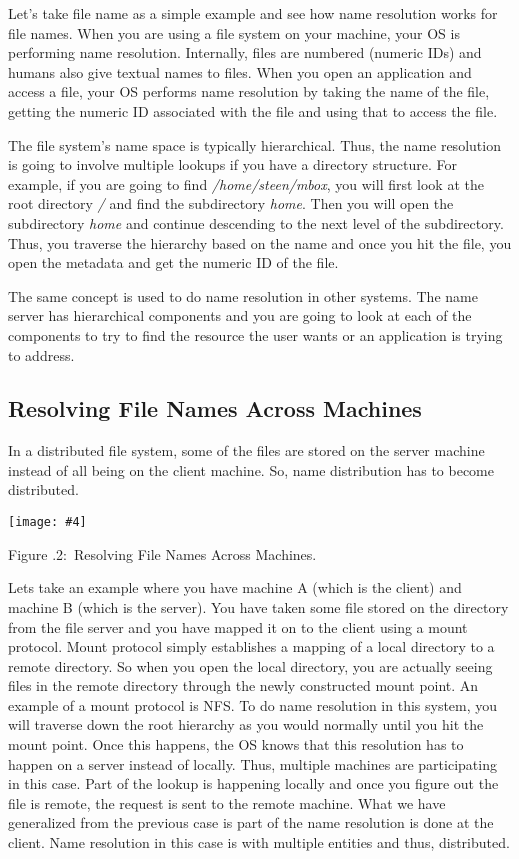 \documentclass[twoside]{article}
\newcounter{lecnum}
\newcommand{\fig}[4]{
            \centerline{\texttt{[image: \#4]}}
            \begin{center}
            Figure \thelecnum.#1:~#3
            \end{center}
    }
\begin{document}
Let’s take file name as a simple example and see how name resolution works for file names. When you are using a file system on your machine, your OS is performing name resolution. Internally, files are numbered (numeric IDs) and humans also give textual names to files. When you open an application and access a file, your OS performs name resolution by taking the name of the file, getting the numeric ID associated with the file and using that to access the file.  

The file system’s name space is typically hierarchical. Thus, the name resolution is going to involve multiple lookups if you have a directory structure. For example, if you are going to find \textit{/home/steen/mbox}, you will first look at the root directory \textit{/} and find the subdirectory \textit{home}. Then you will open the subdirectory \textit{home} and continue descending to the next level of the subdirectory. Thus, you traverse the hierarchy based on the name and once you hit the file, you open the metadata and get the numeric ID of the file. 

The same concept is used to do name resolution in other systems. The name server has hierarchical components and you are going to look at each of the components to try to find the resource the user wants or an application is trying to address.

\subsection{Resolving File Names Across Machines}
In a distributed file system, some of the files are stored on the server machine instead of all being on the client machine. So, name distribution has to become distributed. 

 \fig{2}{0.8}{Resolving File Names Across Machines.}{distributed_naming.png}
 
Lets take an example where you have machine A (which is the client) and machine B (which is the server). You have taken some file stored on the directory from the file server and you have mapped it on to the client using a mount protocol. Mount protocol simply establishes a mapping of a local directory to a remote directory. So when you open the local directory, you are actually seeing files in the remote directory through the newly constructed mount point. An example of a mount protocol is NFS. To do name resolution in this system, you will traverse down the root hierarchy as you would normally until you hit the mount point. Once this happens, the OS knows that this resolution has to happen on a server instead of locally. Thus, multiple machines are participating in this case. Part of the lookup is happening locally and once you figure out the file is remote, the request is sent to the remote machine. What we have generalized from the previous case is part of the name resolution is done at the client. Name resolution in this case is with multiple entities and thus, distributed.
\end{document}
